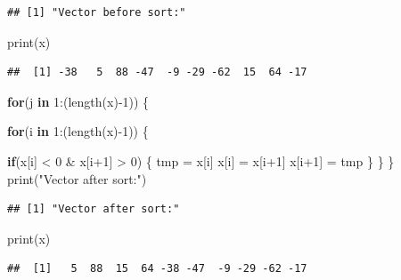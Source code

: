 \documentclass[
]{book}
\newenvironment{Shaded}{\begin{snugshade}}{\end{snugshade}}
\newcommand{\ControlFlowTok}[1]{\textcolor[rgb]{0.13,0.29,0.53}{\textbf{#1}}}
\newcommand{\DecValTok}[1]{\textcolor[rgb]{0.00,0.00,0.81}{#1}}
\newcommand{\FunctionTok}[1]{\textcolor[rgb]{0.00,0.00,0.00}{#1}}
\newcommand{\NormalTok}[1]{#1}
\newcommand{\OtherTok}[1]{\textcolor[rgb]{0.56,0.35,0.01}{#1}}
\newcommand{\SpecialCharTok}[1]{\textcolor[rgb]{0.00,0.00,0.00}{#1}}
\newcommand{\StringTok}[1]{\textcolor[rgb]{0.31,0.60,0.02}{#1}}
\begin{document}
\begin{verbatim}
## [1] "Vector before sort:"
\end{verbatim}

\begin{Shaded}
\begin{Highlighting}[]
\FunctionTok{print}\NormalTok{(x)}
\end{Highlighting}
\end{Shaded}

\begin{verbatim}
##  [1] -38   5  88 -47  -9 -29 -62  15  64 -17
\end{verbatim}

\begin{Shaded}
\begin{Highlighting}[]
\ControlFlowTok{for}\NormalTok{(j }\ControlFlowTok{in} \DecValTok{1}\SpecialCharTok{:}\NormalTok{(}\FunctionTok{length}\NormalTok{(x)}\SpecialCharTok{{-}}\DecValTok{1}\NormalTok{)) \{}
  
  \ControlFlowTok{for}\NormalTok{(i }\ControlFlowTok{in} \DecValTok{1}\SpecialCharTok{:}\NormalTok{(}\FunctionTok{length}\NormalTok{(x)}\SpecialCharTok{{-}}\DecValTok{1}\NormalTok{)) \{}
    
    \ControlFlowTok{if}\NormalTok{(x[i] }\SpecialCharTok{\textless{}} \DecValTok{0} \SpecialCharTok{\&}\NormalTok{ x[i}\SpecialCharTok{+}\DecValTok{1}\NormalTok{] }\SpecialCharTok{\textgreater{}} \DecValTok{0}\NormalTok{) \{}
\NormalTok{      tmp }\OtherTok{=}\NormalTok{ x[i]}
\NormalTok{      x[i] }\OtherTok{=}\NormalTok{ x[i}\SpecialCharTok{+}\DecValTok{1}\NormalTok{]}
\NormalTok{      x[i}\SpecialCharTok{+}\DecValTok{1}\NormalTok{] }\OtherTok{=}\NormalTok{ tmp}
\NormalTok{    \}}
\NormalTok{  \}}
\NormalTok{\}}
\FunctionTok{print}\NormalTok{(}\StringTok{"Vector after sort:"}\NormalTok{)}
\end{Highlighting}
\end{Shaded}

\begin{verbatim}
## [1] "Vector after sort:"
\end{verbatim}

\begin{Shaded}
\begin{Highlighting}[]
\FunctionTok{print}\NormalTok{(x)}
\end{Highlighting}
\end{Shaded}

\begin{verbatim}
##  [1]   5  88  15  64 -38 -47  -9 -29 -62 -17
\end{verbatim}
\end{document}
